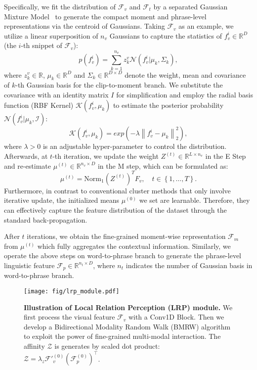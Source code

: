 \documentclass[10pt,twocolumn,letterpaper]{article}
\begin{document}
Specifically, we fit the distribution of $\mathcal{F}_v$ and $\mathcal{F}_t$ by a separated Gaussian Mixture Model~\cite{gmm} to generate the compact moment and phrase-level representations via the centroid of Gaussians.
Taking $\mathcal{F}_v$ as an example,
we utilize a linear superposition of $n_v$ Gaussians to capture the statistics of $f_v^i \in \mathbb{R}^D$ (the $i$-th snippet of $\mathcal{F}_v$):
\begin{equation}
p(f_v^i)=\sum_{k=1}^{n_v} z_{k}^v\mathcal{N} (f_v^i|\mu_k, \Sigma _k),
\end{equation}
where $z_{k}^v \in \mathbb{R}$, $\mu_k \in \mathbb{R}^D$ and $\Sigma_k \in \mathbb{R}^{D\times D}$ denote the weight, mean and covariance of $k$-th Gaussian basis for the clip-to-moment branch.
We substitute the covariance with an identity matrix $I$ for simplification and employ the radial basis function (RBF Kernel) $\mathcal{K}(f_v^i,\mu_k)$ to estimate the posterior probability $\mathcal{N} (f_v^i|\mu _k, \mathcal{I} )$:
\begin{equation}
    \mathcal{K}(f_v^i,\mu_k) = exp(- \lambda \left \| f_v^i -\mu_k \right \| _2^2),
\end{equation}
where $\lambda > 0$ is an adjustable hyper-parameter to control the distribution.
Afterwards, at $t$-th iteration, we update the weight $Z^{(t)} \in \mathbb{R}^{L\times n_v}$ in the E Step and re-estimate $\mu^{(t)} \in \mathbb{R}^{n_v\times D}$ in the M step, which can be formulated as:
\begin{equation}
\label{t-step}
    \mu^{(t)} = \mathrm{Norm_1}(Z^{(t)})^TF_v,\quad t\in \left \{  1,\dots,T\right \}.
\end{equation}
Furthermore, in contrast to conventional cluster methods that only involve iterative update, the initialized means $\mu^{(0)}$ we set are learnable.
Therefore, they can effectively capture the feature distribution of the dataset through the standard back-propagation.

After $t$ iterations, we obtain the fine-grained moment-wise representation $\mathcal{F}_m$ from $\mu^{(t)}$ which fully aggregates the contextual information.
Similarly, we operate the above steps on word-to-phrase branch to generate the phrase-level linguistic feature $\mathcal{F}_p \in \mathbb{R}^{n_t \times D}$, where $n_t$ indicates the number of Gaussian basis in word-to-phrase branch. 

\begin{figure}
    \centering
    \texttt{[image: fig/lrp\_module.pdf]}
    \caption{\textbf{Illustration of Local Relation Perception (LRP) module.} We first process the visual feature $\mathcal{F}_v$ with a Conv1D Block. Then we develop a Bidirectional Modality Random Walk (BMRW) algorithm to exploit the power of fine-grained multi-modal interaction. The affinity $\mathcal{Z}$ is generates by scaled dot product: $\mathcal{Z}=\lambda_{z}\mathcal{F'}_v^{(0)} (\mathcal{F}_p^{(0)})^{\top }$.}
    \label{fig:lrp_module}
    \vspace{-10pt}
\end{figure}
\vspace{-10pt}
\end{document}
